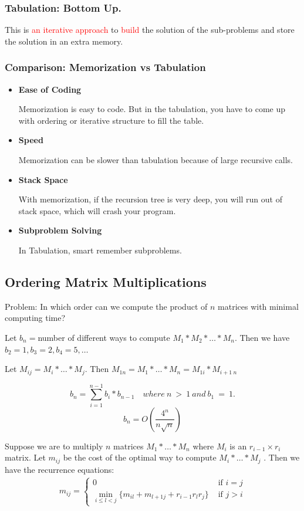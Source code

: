 \documentclass{article}
\begin{document}
\subsubsection{\textbf{Tabulation:} Bottom Up.}
This is \textcolor{red}{an iterative approach} to \textcolor{red}{build} the solution of the sub-problems and store the solution in an extra memory.

\subsubsection{Comparison: Memorization vs Tabulation}
\begin{itemize}
    \item \textbf{Ease of Coding}\par
    Memorization is easy to code. But in the tabulation, you have to come up with ordering or iterative structure to fill the table.
    \item \textbf{Speed}\par
    Memorization can be slower than tabulation because of large recursive calls.
    \item \textbf{Stack Space}\par
    With memorization, if the recursion tree is very deep, you will run out of stack space, which will crash your program.
    \item \textbf{Subproblem Solving}\par
    In Tabulation, smart remember subproblems.
\end{itemize}

\subsection{Ordering Matrix Multiplications}
Problem:  In which order can we compute the product of $n$ matrices with minimal computing time?\par

Let $b_n = $number of different ways to compute $M_1*M_2*\dots*M_n$. Then we have $b_2 = 1, b_3 = 2, b_4 = 5,\dots$\par
Let $M_{ij} = M_i * \dots * M_j$. Then $M_{1n} = M_1 * \dots * M_n = M_{1i} * M_{i+1 \ n}$\par
$$b_n = \sum_{i=1}^{n-1} b_i * b_{n-1} \quad where \ n \ > \ 1 \ and \ b_1 \ = \ 1.$$
$$b_n = O(\frac{4^n}{n\sqrt{n}})$$
\hspace*{\fill} \par
Suppose we are to multiply  $n$  matrices  $M_1*\dots*M_n$  where  $M_i$  is an $r_{i-1}\times r_i$ matrix.  Let $m_{ij}$ be the cost of the optimal way to compute  $M_i*\dots*M_j$ .  Then we have the recurrence equations:
\begin{align*}
    m_{ij}=\left\{ \begin{array}{ll}
        0 & \text{ if }i=j\\
        \min_{i\le l <j}\{ m_{il}+m_{l+1j}+r_{i-1}r_l r_j \} & \text{ if }j>i
    \end{array} \right.
\end{align*}
\end{document}
